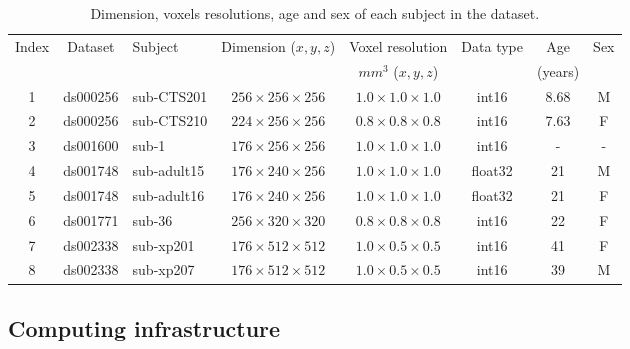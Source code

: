 \documentclass[lettersize,journal]{IEEEtran}
\begin{document}
\begin{table}
  \begin{center}
    \begin{tabular}{c|c|l|c|c|c|c|c}
      Index & Dataset  & Subject     & Dimension ($x,y,z$)         & Voxel resolution            & Data type & Age     & Sex \\
            &          &             &                             & $mm^3$ ($x,y,z$)            &           & (years) &     \\
      \hline
      1     & ds000256 & sub-CTS201  & $256 \times 256 \times 256$ & $1.0 \times 1.0 \times 1.0$ & int16     & 8.68    & M   \\
      2     & ds000256 & sub-CTS210  & $224 \times 256 \times 256$ & $0.8 \times 0.8 \times 0.8$ & int16     & 7.63    & F   \\
      3     & ds001600 & sub-1       & $176 \times 256 \times 256$ & $1.0 \times 1.0 \times 1.0$ & int16     & -       & -   \\
      4     & ds001748 & sub-adult15 & $176 \times 240 \times 256$ & $1.0 \times 1.0 \times 1.0$ & float32   & 21      & M   \\
      5     & ds001748 & sub-adult16 & $176 \times 240 \times 256$ & $1.0 \times 1.0 \times 1.0$ & float32   & 21      & F   \\
      6     & ds001771 & sub-36      & $256 \times 320 \times 320$ & $0.8 \times 0.8 \times 0.8$ & int16     & 22      & F   \\
      7     & ds002338 & sub-xp201   & $176 \times 512 \times 512$ & $1.0 \times 0.5 \times 0.5$ & int16     & 41      & F   \\
      8     & ds002338 & sub-xp207   & $176 \times 512 \times 512$ & $1.0 \times 0.5 \times 0.5$ & int16     & 39      & M   \\
    \end{tabular}
  \end{center}
  \caption{Dimension, voxels resolutions, age and sex of each subject in the dataset.}
  \label{table:dataset_info}
\end{table}

\subsection{Computing infrastructure}
\label{subsec:computing_infrastructure}
\end{document}
